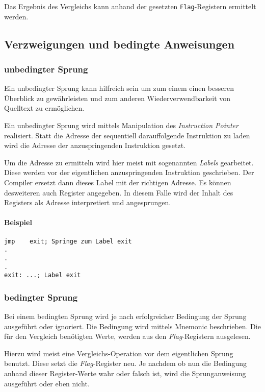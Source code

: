 Das Ergebnis des Vergleichs kann anhand der gesetzten \texttt{Flag}-Registern ermittelt werden.


\subsection{Verzweigungen und bedingte Anweisungen}

\subsubsection{unbedingter Sprung}
Ein unbedingter Sprung kann hilfreich sein um zum einem einen besseren Überblick zu gewährleisten und zum anderen Wiederverwendbarkeit von Quelltext zu ermöglichen.

Ein unbedingter Sprung wird mittels Manipulation des \textit{Instruction Pointer} realisiert.
Statt die Adresse der sequentiell darauffolgende Instruktion zu laden wird die Adresse der anzuspringenden Instruktion gesetzt.

Um die Adresse zu ermitteln wird hier meist mit sogenannten \textit{Labels} gearbeitet. Diese werden vor der eigentlichen anzuspringenden Instruktion geschrieben. Der Compiler ersetzt dann dieses Label mit der richtigen Adresse. Es können desweiteren auch Register angegeben. In diesem Falle wird der Inhalt des Registers als Adresse interpretiert und angesprungen.

\paragraph{Beispiel}
\begin{verbatim}jmp    exit; Springe zum Label exit
.
.
.
exit: ...; Label exit\end{verbatim}

\subsubsection{bedingter Sprung}
Bei einem bedingten Sprung wird je nach erfolgreicher Bedingung der Sprung ausgeführt oder ignoriert. Die Bedingung wird mittels Mnemonic beschrieben. Die für den Vergleich benötigten Werte, werden aus den \textit{Flag}-Registern ausgelesen.

Hierzu wird meist eine Vergleichs-Operation vor dem eigentlichen Sprung benutzt. Diese setzt die \textit{Flag}-Register neu. Je nachdem ob nun die Bedingung anhand dieser Register-Werte wahr oder falsch ist, wird die Sprunganweisung ausgeführt oder eben nicht. 

